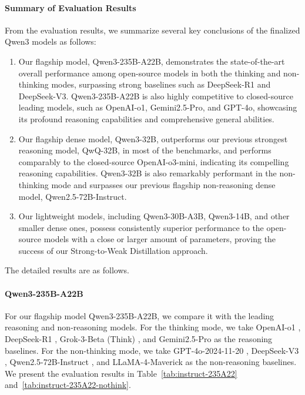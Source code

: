 \documentclass[dvipsnames]{article}
\begin{document}
\paragraph{Summary of Evaluation Results}
From the evaluation results, we summarize several key conclusions of the finalized Qwen3 models as follows:
\begin{enumerate}[label=(\arabic*)]
    \item Our flagship model, Qwen3-235B-A22B, demonstrates the state-of-the-art overall performance among open-source models in both the thinking and non-thinking modes, surpassing strong baselines such as DeepSeek-R1 and DeepSeek-V3.
    Qwen3-235B-A22B is also highly competitive to closed-source leading models, such as OpenAI-o1, Gemini2.5-Pro, and GPT-4o, showcasing its profound reasoning capabilities and comprehensive general abilities.
    \item Our flagship dense model, Qwen3-32B, outperforms our previous strongest reasoning model, QwQ-32B, in most of the benchmarks, and performs comparably to the closed-source OpenAI-o3-mini, indicating its compelling reasoning capabilities.
    Qwen3-32B is also remarkably performant in the non-thinking mode and surpasses our previous flagship non-reasoning dense model, Qwen2.5-72B-Instruct.
    \item Our lightweight models, including Qwen3-30B-A3B, Qwen3-14B, and other smaller dense ones, possess consistently superior performance to the open-source models with a close or larger amount of parameters, proving the success of our Strong-to-Weak Distillation approach.
\end{enumerate}

The detailed results are as follows.

\paragraph{Qwen3-235B-A22B}
For our flagship model Qwen3-235B-A22B, we compare it with the leading reasoning and non-reasoning models.
For the thinking mode, we take OpenAI-o1 \citep{o1}, DeepSeek-R1 \citep{r1}, Grok-3-Beta (Think) \citep{grok3}, and Gemini2.5-Pro \citep{gemini2.5} as the reasoning baselines.
For the non-thinking mode, we take GPT-4o-2024-11-20 \citep{gpt4o}, DeepSeek-V3 \citep{deepseekv3}, Qwen2.5-72B-Instruct \citep{qwen2.5}, and LLaMA-4-Maverick \citep{llama4} as the non-reasoning baselines.
We present the evaluation results in Table~\ref{tab:instruct-235A22} and~\ref{tab:instruct-235A22-nothink}.
\end{document}

